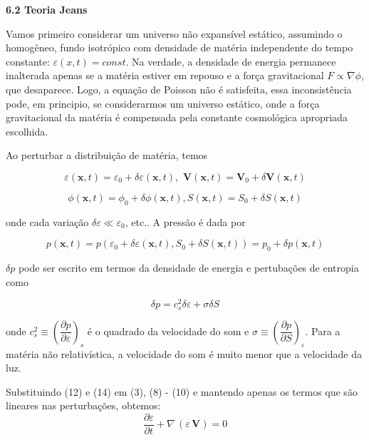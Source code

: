 \documentclass[a4paper,12pt]{article}
\begin{document}
\begin{center}	
	\textbf{6.2 Teoria Jeans}
\end{center}

Vamos primeiro considerar um universo não expansível estático, assumindo o homogêneo,
fundo isotrópico com densidade de matéria independente do tempo constante: $\varepsilon (x,t)= const$. Na verdade, a densidade de energia permanece inalterada apenas se a matéria estiver em repouso e a força gravitacional $F \propto\nabla\phi$, que desaparece. Logo, a equação de Poisson não é satisfeita, essa inconsistência pode, em principio, se considerarmos um universo estático, onde a força gravitacional da matéria é compensada pela constante cosmológica apropriada escolhida.

Ao perturbar a distribuição de matéria, temos

\begin{equation}
	\varepsilon (\textbf{x},t) = \varepsilon_0 + \delta\varepsilon (\textbf{x},t),\,\, \textbf{V} (\textbf{x},t) = \textbf{V}_0 +\delta\textbf{V} (\textbf{x},t) 
\end{equation}

$$\phi (\textbf{x},t) = \phi_0 + \delta\phi (\textbf{x},t), S (\textbf{x},t)= S_0 + \delta S (\textbf{x},t)$$

onde cada variação $\delta\varepsilon \ll \varepsilon_0$, etc..
\newline
A pressão é dada por

\begin{equation}
	p (\textbf{x},t) = p( \varepsilon_0 + \delta\varepsilon (\textbf{x},t), S_0 + \delta S (\textbf{x},t) ) = p_0 +\delta p (\textbf{x},t) 
\end{equation}

$\delta p$ pode ser escrito em termos da densidade de energia e pertubações de entropia como

\begin{equation}
	\delta p = c_s^2\delta\varepsilon + \sigma\delta S
\end{equation}

onde $c^2_s \equiv \left(\dfrac{\partial p}{\partial\varepsilon}\right)_s$ é o quadrado da velocidade do som e $\sigma \equiv \left(\dfrac{\partial p}{\partial S}\right)_\varepsilon$. Para a matéria não relativística, a velocidade do som é muito menor que a velocidade da luz.

Substituindo (12) e (14) em (3), (8) - (10) e mantendo apenas os termos
que são lineares nas perturbações, obtemos:
\newline
$$\dfrac{\partial \varepsilon}{\partial t} +\nabla \,(\varepsilon \, \textbf{V}) = 0$$
\end{document}
